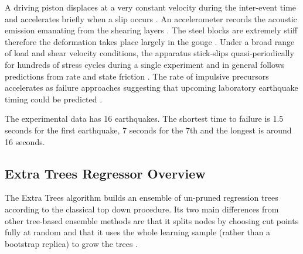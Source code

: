 \documentclass[]{llncs} %
\begin{document}
A driving piston displaces at a very constant velocity during the inter-event time and accelerates briefly when a slip occurs \cite{Bertrand}. An accelerometer records the acoustic emission emanating from the shearing layers \cite{Bertrand}. The steel blocks are extremely stiff therefore the deformation takes place largely in the gouge \cite{Bertrand}. Under a broad range of load and shear velocity conditions, the apparatus stick‐slips quasi‐periodically for hundreds of stress cycles during a single experiment and in general follows predictions from rate and state friction \cite{Bertrand}. The rate of impulsive precursors accelerates as failure approaches suggesting that upcoming laboratory earthquake timing could be predicted \cite{Bertrand}. \par

The experimental data has 16 earthquakes. The shortest time to failure is 1.5 seconds for the first earthquake, 7 seconds for the 7th and the longest is around 16 seconds. \par

\subsection{Extra Trees Regressor Overview}
The Extra Trees algorithm builds an ensemble of un-pruned regression trees according to the classical top down procedure. Its two main differences from other tree-based ensemble methods are that it splits nodes by choosing cut points fully at random and that it uses the whole learning sample (rather than a bootstrap replica) to grow the trees \cite{ExtremeRandomTrees}. \par
\end{document}
